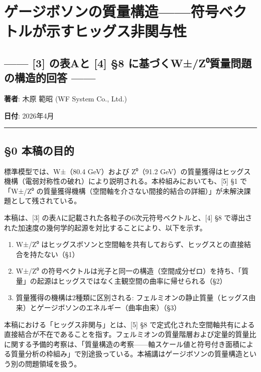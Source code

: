 \documentclass[
  a4paper,11pt]{ltjsarticle}
\providecommand{\tightlist}{%
  \setlength{\itemsep}{0pt}\setlength{\parskip}{0pt}}
\theoremstyle{definition}
\theoremstyle{remark}
\begin{document}
\section{ゲージボソンの質量構造------符号ベクトルが示すヒッグス非関与性}\label{ux30b2ux30fcux30b8ux30dcux30bdux30f3ux306eux8ceaux91cfux69cbux9020ux7b26ux53f7ux30d9ux30afux30c8ux30ebux304cux793aux3059ux30d2ux30c3ux30b0ux30b9ux975eux95a2ux4e0eux6027}

\subsection{------ {[}3{]} の表Aと {[}4{]} §8
に基づくW±/Z⁰質量問題の構造的回答
------}\label{ux306eux8868aux3068-4-8-ux306bux57faux3065ux304fwzux2070ux8ceaux91cfux554fux984cux306eux69cbux9020ux7684ux56deux7b54}

\textbf{著者}: 木原 範昭 (WF System Co., Ltd.)

\textbf{日付}: 2026年4月

\begin{center}\rule{0.5\linewidth}{0.5pt}\end{center}

\subsection{§0 本稿の目的}\label{ux672cux7a3fux306eux76eeux7684}

標準模型では、W±（80.4 GeV）および Z⁰（91.2
GeV）の質量獲得はヒッグス機構（電弱対称性の破れ）により説明される。本枠組みにおいても、{[}5{]}
§1 で「W±/Z⁰
の質量獲得機構（空間軸を介さない間接的結合の詳細）」が未解決課題として残されている。

本稿は、{[}3{]} の表Aに記載された各粒子の6次元符号ベクトルと、{[}4{]} §8
で導出された加速度の幾何学的起源を対比することにより、以下を示す。

\begin{enumerate}
\def\labelenumi{\arabic{enumi}.}
\tightlist
\item
  W±/Z⁰
  はヒッグスボソンと空間軸を共有しておらず、ヒッグスとの直接結合を持たない（§1）
\item
  W±/Z⁰
  の符号ベクトルは光子と同一の構造（空間成分ゼロ）を持ち、「質量」の起源はヒッグスではなく主観空間の曲率に帰せられる（§2）
\item
  質量獲得の機構は2種類に区別される:
  フェルミオンの静止質量（ヒッグス由来）とゲージボソンのエネルギー（曲率由来）（§3）
\end{enumerate}

本稿における「ヒッグス非関与」とは、{[}5{]} §8
で定式化された空間軸共有による直接結合が不在であることを指す。フェルミオンの質量階層および定量的質量比に関する予備的考察は、「質量構造の考察------軸スケール値と符号付き面積による質量分析の枠組み」で別途扱っている。本補講はゲージボソンの質量構造という別の問題領域を扱う。
\end{document}
